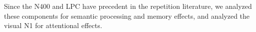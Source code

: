 Since the N400 and LPC have precedent in the repetition literature, we analyzed these components for semantic processing and memory effects, and analyzed the visual N1 for attentional effects.









